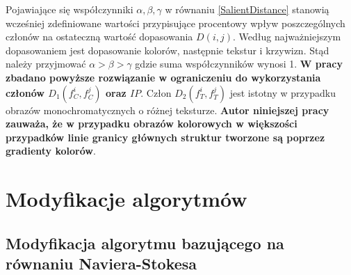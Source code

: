 \documentclass[12pt, twoside, openany]{report}
\theoremstyle{definition}
\begin{document}
Pojawiające się współczynniki $\alpha ,\beta ,\gamma $ w równaniu \eqref{SalientDistance} stanowią wcześniej zdefiniowane wartości przypisujące procentowy wpływ poszczególnych członów na ostateczną wartość dopasowania $D(i,j)$. Według \cite{SalientStrucTexProp} najważniejszym dopasowaniem jest dopasowanie kolorów, następnie tekstur i krzywizn. Stąd należy przyjmować $\alpha >\beta >\gamma $ gdzie suma współczynników wynosi 1. \textbf{W pracy zbadano powyższe rozwiązanie w ograniczeniu do wykorzystania członów $D_1\left(f^i_C,f^j_C\right)$ oraz $IP$}. Człon $D_2\left(f^i_T,f^j_T\right)$ jest istotny w przypadku obrazów monochromatycznych o różnej teksturze. \textbf{Autor niniejszej pracy zauważa, że w przypadku obrazów kolorowych w większości przypadków linie granicy głównych struktur tworzone są poprzez gradienty kolorów}.
\chapter{Modyfikacje algorytmów}
\section{Modyfikacja algorytmu bazującego na równaniu Naviera-Stokesa}
\end{document}
